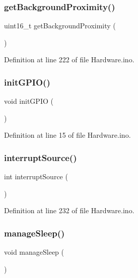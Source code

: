 \subsubsection{\texorpdfstring{getBackgroundProximity()}{getBackgroundProximity()}}
{\footnotesize\ttfamily uint16\+\_\+t get\+Background\+Proximity (\begin{DoxyParamCaption}{ }\end{DoxyParamCaption})}



Definition at line 222 of file Hardware.\+ino.

\mbox{\label{_hardware_8ino_ae8297bf2b99a2ad67af6f9a421ea4b16}} 
\subsubsection{\texorpdfstring{initGPIO()}{initGPIO()}}
{\footnotesize\ttfamily void init\+G\+P\+IO (\begin{DoxyParamCaption}{ }\end{DoxyParamCaption})}



Definition at line 15 of file Hardware.\+ino.

\mbox{\label{_hardware_8ino_aa94b41c6422176525df39bf97ab00a44}} 
\subsubsection{\texorpdfstring{interruptSource()}{interruptSource()}}
{\footnotesize\ttfamily int interrupt\+Source (\begin{DoxyParamCaption}{ }\end{DoxyParamCaption})}



Definition at line 232 of file Hardware.\+ino.

\mbox{\label{_hardware_8ino_ad4c5e747325f2adbdafd68b6c6489e45}} 
\subsubsection{\texorpdfstring{manageSleep()}{manageSleep()}}
{\footnotesize\ttfamily void manage\+Sleep (\begin{DoxyParamCaption}{ }\end{DoxyParamCaption})}



